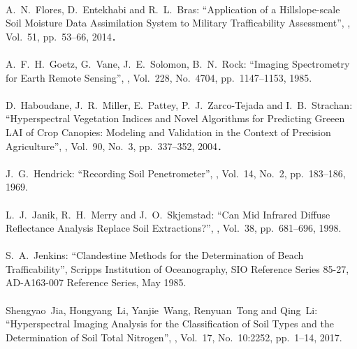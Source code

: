 \begin{mythebibliography}{}
\leavevmode \\A.~N.~Flores, D.~Entekhabi and R.~L.~Bras:
\newblock ``Application of a Hillslope-scale Soil Moisture Data Assimilation System to Military Trafficability Assessment'',
, Vol.~51, pp.~53--66, 2014．
\\

\leavevmode \\A.~F.~H.~Goetz, G.~Vane, J.~E.~Solomon, B.~N.~Rock:
\newblock ``Imaging Spectrometry for Earth Remote Sensing'',
, Vol.~228, No.~4704, pp.~1147--1153, 1985.
\\

\leavevmode \\D.~Haboudane, J.~R.~Miller, E.~Pattey, P.~J.~Zarco-Tejada and I.~B.~Strachan:
\newblock ``Hyperspectral Vegetation Indices and Novel Algorithms for Predicting Greeen LAI of Crop Canopies: Modeling and Validation in the Context of Precision Agriculture'',
, Vol.~90, No.~3, pp.~337--352, 2004．
\\

\leavevmode \\J.~G.~Hendrick:
\newblock ``Recording Soil Penetrometer'',
, Vol.~14, No.~2, pp.~183--186, 1969.
\\

\leavevmode \\L.~J.~Janik, R.~H.~Merry and J.~O.~Skjemstad:
\newblock ``Can Mid Infrared Diffuse Reflectance Analysis Replace Soil Extractions?'',
, Vol.~38, pp.~681--696, 1998.
\\ 

\leavevmode \\S.~A.~Jenkins:
\newblock ``Clandestine Methods for the Determination of Beach Trafficability'',
\newblock Scripps Institution of Oceanography, SIO Reference Series 85-27, AD-A163-007 Reference Series, May 1985.
\\

\leavevmode \\Shengyao~Jia, Hongyang~Li, Yanjie~Wang, Renyuan~Tong and  Qing~Li:
\newblock ``Hyperspectral Imaging Analysis for the Classification of Soil Types and the Determination of Soil Total Nitrogen'',
, Vol.~17, No.~10:2252, pp.~1--14, 2017.
\\ 


\end{mythebibliography}
